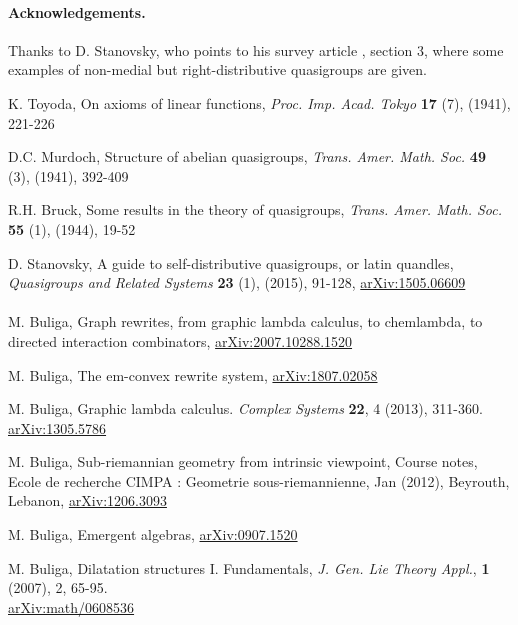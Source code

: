 \documentclass{article}
\begin{document}
\paragraph{Acknowledgements.} Thanks to D. Stanovsky, who points to his survey article \cite{stanovsky}, section 3, where some examples of non-medial but right-distributive quasigroups are given. 

\begin{thebibliography}{99}

 K. Toyoda, On axioms of linear functions, {\it Proc. Imp. Acad. Tokyo} {\bf 17} (7), (1941), 221-226

 D.C. Murdoch, Structure of abelian quasigroups, {\it Trans. Amer. Math. Soc.} {\bf 49} (3), (1941), 392-409

 R.H. Bruck, Some results in the theory of quasigroups, {\it Trans. Amer. Math. Soc.} {\bf 55} (1), (1944), 19-52

 D. Stanovsky, A guide to self-distributive quasigroups, or latin quandles, {\it Quasigroups and Related Systems} {\bf 23} (1), (2015), 91-128, \href{https://arxiv.org/abs/1505.06609}{arXiv:1505.06609} \\ 

 \\


 M. Buliga, Graph rewrites, from graphic lambda calculus, to chemlambda, to directed interaction combinators, \href{https://arxiv.org/abs/2007.10288}{arXiv:2007.10288.1520}

 M. Buliga, The em-convex rewrite system, \href{https://arxiv.org/abs/1807.02058}{arXiv:1807.02058}

 M. Buliga, Graphic lambda calculus. {\it Complex Systems} {\bf 22}, 4 (2013), 311-360. \\ 
\href{https://arxiv.org/abs/1305.5786}{arXiv:1305.5786}

 M. Buliga, Sub-riemannian geometry from intrinsic viewpoint, Course notes, Ecole de recherche CIMPA : Geometrie sous-riemannienne, Jan (2012), Beyrouth, Lebanon,  \href{https://arxiv.org/abs/1206.3093}{arXiv:1206.3093}

 M. Buliga, Emergent algebras, \href{https://arxiv.org/abs/0907.1520}{arXiv:0907.1520}

 M. Buliga, Dilatation structures I. Fundamentals, {\it 
J. Gen. Lie Theory Appl.},  {\bf 1} (2007),  2, 65-95. \\ 
\href{https://arxiv.org/abs/math/0608536}{arXiv:math/0608536}



\end{thebibliography}
\end{document}
